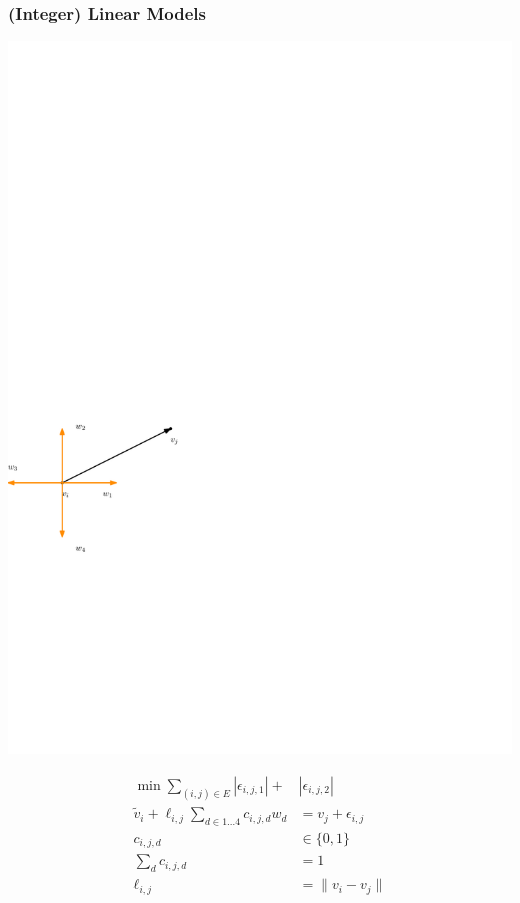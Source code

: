 \documentclass[12pt,t,xcolor=dvipsnames]{beamer}
\begin{document}
\begin{frame}
  \frametitle{(Integer) Linear Models}
  \begin{minipage}[l]{0.45\textwidth}
    \includegraphics[width=\textwidth]{snapping.pdf}
    \end{minipage}
    \begin{minipage}[r]{0.48\textwidth}
    \begin{align*}
      \min \sum_{(i,j) \in E} |\epsilon_{i,j,1}| +& |\epsilon_{i,j,2}| \\
      \tilde{v}_i + \ell_{i,j}\sum_{d\in 1\dots 4}c_{i,j,d}w_d &= v_j+\epsilon_{i,j}\\
      c_{i,j,d} &\in \{0, 1\}\\
      \sum_{d} c_{i,j,d} &= 1\\
      \ell_{i,j} &= \| v_i - v_j\|
    \end{align*}
  \end{minipage}

\end{frame}
\end{document}
